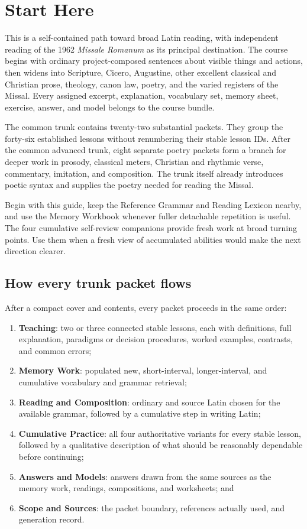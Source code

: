 \chapter{Start Here}

This is a self-contained path toward broad Latin reading, with independent
reading of the 1962 \emph{Missale Romanum} as its principal destination. The
course begins with ordinary project-composed sentences about visible things
and actions, then widens into Scripture, Cicero, Augustine, other excellent
classical and Christian prose, theology, canon law, poetry, and the varied
registers of the Missal. Every assigned excerpt, explanation, vocabulary set,
memory sheet, exercise, answer, and model belongs to the course bundle.

The common trunk contains twenty-two substantial packets. They group the
forty-six established lessons without renumbering their stable lesson IDs.
After the common advanced trunk, eight separate poetry packets form a branch
for deeper work in prosody, classical meters, Christian and rhythmic verse,
commentary, imitation, and composition. The trunk itself already introduces
poetic syntax and supplies the poetry needed for reading the Missal.

Begin with this guide, keep the Reference Grammar and Reading Lexicon nearby,
and use the Memory Workbook whenever fuller detachable repetition is useful.
The four cumulative self-review companions provide fresh work at broad
turning points. Use them when a fresh view of accumulated abilities would make
the next direction clearer.

\section{How every trunk packet flows}

After a compact cover and contents, every packet proceeds in the same order:

\begin{enumerate}
  \item \textbf{Teaching}: two or three connected stable lessons, each with
        definitions, full explanation, paradigms or decision procedures,
        worked examples, contrasts, and common errors;
  \item \textbf{Memory Work}: populated new, short-interval, longer-interval,
        and cumulative vocabulary and grammar retrieval;
  \item \textbf{Reading and Composition}: ordinary and source Latin chosen for
        the available grammar, followed by a cumulative step in writing Latin;
  \item \textbf{Cumulative Practice}: all four authoritative variants for
        every stable lesson, followed by a qualitative description of what
        should be reasonably dependable before continuing;
  \item \textbf{Answers and Models}: answers drawn from the same sources as the
        memory work, readings, compositions, and worksheets; and
  \item \textbf{Scope and Sources}: the packet boundary, references actually
        used, and generation record.
\end{enumerate}

